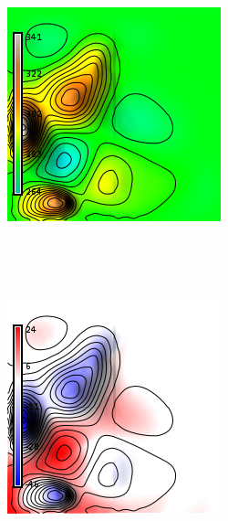 \documentclass{sigchi}
\begin{document}
\begin{figure}
\begin{minipage}[t]{0.33\textwidth}
\begin{subfigure}{\linewidth}
            \includegraphics[width=\textwidth]{figures/magallanes/magallanes_dem_6.png}%
            \caption{}~\label{fig:dem_6}
        \end{subfigure}\\
        \begin{subfigure}{\linewidth}
            \centering
            \includegraphics[width=\textwidth]{figures/magallanes/magallanes_diff_6.png}%

\end{subfigure}
\end{minipage}
\end{figure}
\end{document}
